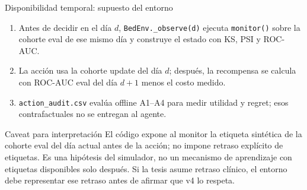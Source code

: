 \documentclass[aspectratio=169,10pt]{beamer}
\begin{document}
\begin{frame}{Disponibilidad temporal: supuesto del entorno}
\begin{enumerate}
  \item Antes de decidir en el día \(d\), \texttt{BedEnv.\_observe(d)} ejecuta
        \texttt{monitor()} sobre la cohorte eval de ese mismo día y construye
        el estado con KS, PSI y ROC-AUC.
  \item La acción usa la cohorte update del día \(d\); después, la recompensa
        se calcula con ROC-AUC eval del día \(d+1\) menos el costo medido.
  \item \texttt{action\_audit.csv} evalúa offline A1--A4 para medir utilidad y
        regret; esos contrafactuales no se entregan al agente.
\end{enumerate}
\begin{alertblock}{Caveat para interpretación}
El código expone al monitor la etiqueta sintética de la cohorte eval del día
actual antes de la acción; no impone retraso explícito de etiquetas. Es una
hipótesis del simulador, no un mecanismo de aprendizaje con etiquetas
disponibles solo después. Si la tesis asume retraso clínico, el entorno debe
representar ese retraso antes de afirmar que v4 lo respeta.
\end{alertblock}
\end{frame}
\end{document}
